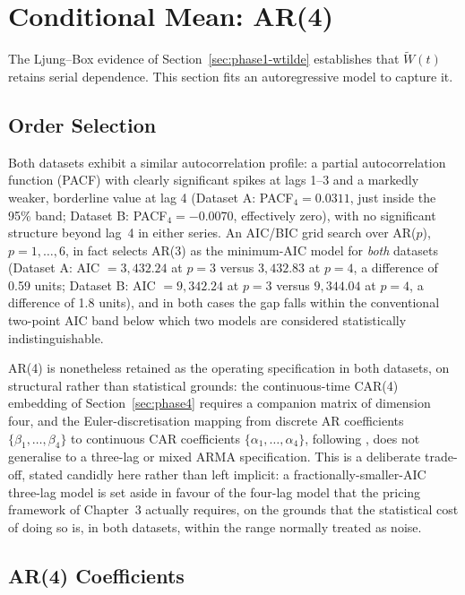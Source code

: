 \section{Conditional Mean: AR(4)}
\label{sec:phase2}

The Ljung--Box evidence of Section~\ref{sec:phase1-wtilde} establishes that $\widetilde W(t)$ retains serial dependence. This section fits an autoregressive model to capture it.

\subsection{Order Selection}
\label{sec:phase2-order}

Both datasets exhibit a similar autocorrelation profile: a partial autocorrelation function (PACF) with clearly significant spikes at lags 1--3 and a markedly weaker, borderline value at lag 4 (Dataset A: PACF$_4 = 0.0311$, just inside the 95\% band; Dataset B: PACF$_4 = -0.0070$, effectively zero), with no significant structure beyond lag~4 in either series. An AIC/BIC grid search over AR($p$), $p = 1,\dots,6$, in fact selects AR(3) as the minimum-AIC model for \emph{both} datasets (Dataset A: AIC $= 3{,}432.24$ at $p=3$ versus $3{,}432.83$ at $p=4$, a difference of 0.59 units; Dataset B: AIC $=9{,}342.24$ at $p=3$ versus $9{,}344.04$ at $p=4$, a difference of 1.8 units), and in both cases the gap falls within the conventional two-point AIC band below which two models are considered statistically indistinguishable.

AR(4) is nonetheless retained as the operating specification in both datasets, on structural rather than statistical grounds: the continuous-time CAR(4) embedding of Section~\ref{sec:phase4} requires a companion matrix of dimension four, and the Euler-discretisation mapping from discrete AR coefficients $\{\beta_1,\dots,\beta_4\}$ to continuous CAR coefficients $\{\alpha_1,\dots,\alpha_4\}$, following \citet{BenthSaltyteBenth2009}, does not generalise to a three-lag or mixed ARMA specification. This is a deliberate trade-off, stated candidly here rather than left implicit: a fractionally-smaller-AIC three-lag model is set aside in favour of the four-lag model that the pricing framework of Chapter~3 actually requires, on the grounds that the statistical cost of doing so is, in both datasets, within the range normally treated as noise.

\subsection{AR(4) Coefficients}
\label{sec:phase2-coefs}

